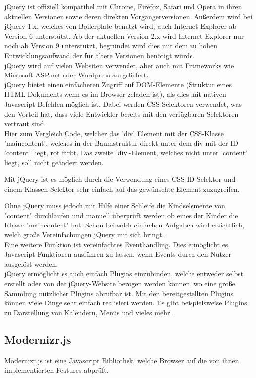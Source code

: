 \documentclass[12pt,journal,compsoc]{IEEEtran}
\begin{document}
jQuery ist offiziell kompatibel mit Chrome, Firefox, Safari und Opera in ihren aktuellen Versionen sowie deren direkten Vorgängerversionen.
Außerdem wird bei jQuery 1.x, welches von Boilerplate benutzt wird, auch Internet Explorer ab Version 6 unterstützt.
Ab der aktuellen Version 2.x wird Internet Explorer nur noch ab Version 9 unterstützt, begründet wird dies mit dem zu hohen Entwicklungsaufwand der für ältere Versionen benötigt würde.
\\
jQuery wird auf vielen Websiten verwendet, aber auch mit Frameworks wie Microsoft ASP.net oder Wordpress ausgeliefert. 
\\
jQuery bietet einen einfacheren Zugriff auf DOM-Elemente (Struktur eines HTML Dokuments wenn es im Browser geladen ist), als dies mit nativen Javascript Befehlen möglich ist.
Dabei werden CSS-Selektoren verwendet, was den Vorteil hat, dass viele Entwickler bereits mit den verfügbaren Selektoren vertraut sind.
\\
Hier zum Vergleich Code, welcher das 'div' Element mit der CSS-Klasse 'maincontent', welches in der Baumstruktur direkt unter dem div mit der ID 'content' liegt, rot färbt.
Das zweite 'div'-Element, welches nicht unter 'content' liegt, soll nicht geändert werden.




Mit jQuery ist es möglich durch die Verwendung eines CSS-ID-Selektor und einem Klassen-Selektor sehr einfach auf das gewünschte Element zuzugreifen.



Ohne jQuery muss jedoch mit Hilfe einer Schleife die Kindselemente von "content" durchlaufen und manuell überprüft werden ob
eines der Kinder die Klasse "maincontent" hat.
Schon bei solch einfachen Aufgaben wird ersichtlich, welch große Vereinfachungen jQuery mit sich bringt.
\\
Eine weitere Funktion ist vereinfachtes Eventhandling. Dies ermöglicht es, Javascript Funktionen ausführen zu lassen, wenn Events durch den Nutzer ausgelöst werden.
\\
jQuery ermöglicht es auch einfach Plugins einzubinden, welche entweder selbst erstellt oder von der jQuery-Website\cite{jquery-plugins} bezogen werden können,
wo eine große Sammlung nützlicher Plugins abrufbar ist. Mit den bereitgestellten Plugins können viele Dinge sehr einfach realisiert werden. Es gibt beispielsweise Plugins zu Darstellung von Kalendern, Menüs und vieles mehr.

\subsection{Modernizr.js}
Modernizr.js\cite{modern} ist eine Javascript Bibliothek, welche Browser auf die von ihnen implementierten Features abprüft. 
\end{document}
